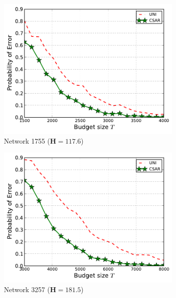 \documentclass{article}
\begin{document}
\begin{figure}[htbp]
\centering
\begin{subfigure}[c]{\imgsize\textwidth}
	\includegraphics[width=\textwidth]{fig/exp/mst-1755}
	\caption{Network 1755 ($\mathbf H=117.6$)}
\end{subfigure}
\begin{subfigure}[c]{\imgsize\textwidth}
	\includegraphics[width=\textwidth]{fig/exp/mst-3257}
	\caption{Network 3257 ($\mathbf H=181.5$)}
\end{subfigure}
\begin{subfigure}[c]{\imgsize\textwidth}

\end{subfigure}
\end{figure}
\end{document}
